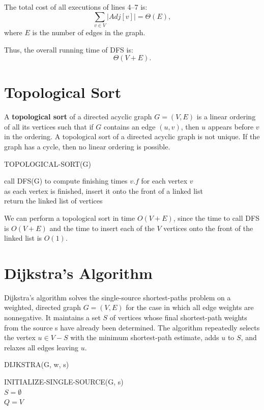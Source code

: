 The total cost of all executions of lines 4--7 is:
\[
\sum_{v \in V} |Adj[v]| = \Theta(E),
\]
where $E$ is the number of edges in the graph.

Thus, the overall running time of DFS is:
\[
\Theta(V + E).
\]

\section{Topological Sort}

A \textbf{topological sort} of a directed acyclic graph $G = (V, E)$ is a linear ordering of all its vertices such that if $G$ contains an edge $(u, v)$, then $u$ appears before $v$ in the ordering. A topological sort of a directed acyclic graph is not unique. If the graph has a cycle, then no linear ordering is possible.

\begin{algorithm}
    \caption{TOPOLOGICAL-SORT(G)}
    call DFS(G) to compute finishing times $v.f$ for each vertex $v$ \\
    as each vertex is finished, insert it onto the front of a linked list \\
    return the linked list of vertices
\end{algorithm}

We can perform a topological sort in time $O(V + E)$, since the time to call DFS is $O(V + E)$ and the time to insert each of the $V$ vertices onto the front of the linked list is $O(1)$.

\newpage 
\section{Dijkstra's Algorithm}

Dijkstra's algorithm solves the single-source shortest-paths problem on a weighted, directed graph $G = (V, E)$ for the case in which all edge weights are nonnegative.
It maintains a set $S$ of vertices whose final shortest-path
weights from the source s have already been determined. The algorithm repeatedly selects the vertex $u \in V - S$
with the minimum shortest-path estimate, adds $u$ to $S$, and relaxes all edges leaving $u$.

\begin{algorithm}
    \caption{DIJKSTRA(G, w, s)}
    INITIALIZE-SINGLE-SOURCE(G, s) \\
    $S = \emptyset$ \\
    $Q = V$ \\
\end{algorithm}

